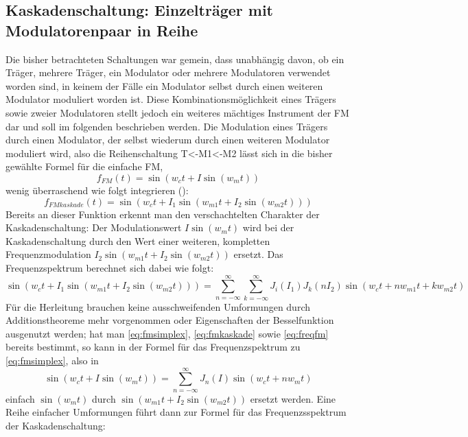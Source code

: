 \subsection{Kaskadenschaltung: Einzelträger mit Modulatorenpaar in Reihe}
\label{cascade}

Die bisher betrachteten Schaltungen war gemein, dass unabhängig davon, ob ein Träger, mehrere Träger, ein Modulator oder mehrere Modulatoren verwendet worden sind, in keinem der Fälle ein Modulator selbst durch einen weiteren Modulator moduliert worden ist. Diese Kombinationsmöglichkeit eines Trägers sowie zweier Modulatoren stellt jedoch ein weiteres mächtiges Instrument der FM dar und soll im folgenden beschrieben werden. Die Modulation eines Trägers durch einen Modulator, der selbst wiederum durch einen weiteren Modulator moduliert wird, also die Reihenschaltung T<-M1<-M2 lässt sich in die bisher gewählte Formel für die einfache FM,
\begin{equation}\label{eq:fmsimplex}
f_{FM}(t) = \sin(w_ct + I\sin(w_mt))
\end{equation}
wenig überraschend wie folgt integrieren (\cite[S.48]{schottstaedt}):
\begin{equation}\label{eq:fmkaskade}
f_{FMkaskade}(t) = \sin(w_ct + I_1\sin(w_{m1}t + I_2\sin(w_{m2}t)))
\end{equation}
Bereits an dieser Funktion erkennt man den verschachtelten Charakter der Kaskadenschaltung: Der Modulationswert $ I\sin(w_mt) $ wird bei der Kaskadenschaltung durch den Wert einer weiteren, kompletten Frequenzmodulation $ I_2\sin(w_{m1}t + I_2\sin(w_{m2}t)) $ ersetzt. Das Frequenzspektrum berechnet sich dabei wie folgt:
\begin{equation}
\sin(w_ct + I_1\sin(w_{m1}t + I_2\sin(w_{m2}t))) = \sum_{n=-\infty}^{\infty}\sum_{k=-\infty}^{\infty}J_i(I_1)J_k(nI_2)\sin(w_ct + nw_{m1}t + kw_{m2}t)
\end{equation}
Für die Herleitung brauchen keine ausschweifenden Umformungen durch Additionstheoreme mehr vorgenommen oder Eigenschaften der Besselfunktion ausgenutzt werden; hat man \ref{eq:fmsimplex}, \ref{eq:fmkaskade} sowie \ref{eq:freqfm} bereits bestimmt, so kann in der Formel für das Frequenzspektrum zu \ref{eq:fmsimplex}, also in
\begin{equation}\label{eq:freqfm}
\sin(w_ct + I\sin(w_mt)) = \sum_{n=-\infty}^{\infty}J_n(I)\sin(w_ct+nw_mt)
\end{equation}
einfach $ \sin(w_mt) $ durch $ \sin(w_{m1}t + I_2\sin(w_{m2}t)) $ ersetzt werden. Eine Reihe einfacher Umformungen führt dann zur Formel für das Frequenzsspektrum der Kaskadenschaltung:

